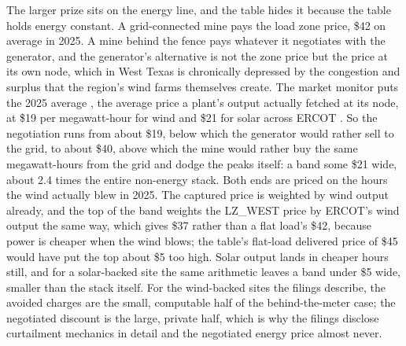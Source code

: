 The larger prize sits on the energy line, and the table hides it because the table holds energy constant. A grid-connected mine pays the load zone price, \$42 on average in 2025. A mine behind the fence pays whatever it negotiates with the generator, and the generator's alternative is not the zone price but the price at its own node, which in West Texas is chronically depressed by the congestion and surplus that the region's wind farms themselves create. The market monitor puts the 2025 average , the average price a plant's output actually fetched at its node, at \$19 per megawatt-hour for wind and \$21 for solar across ERCOT \autocite{potomac2026somercot}. %
So the negotiation runs from about \$19, below which the generator would rather sell to the grid, to about \$40, above which the mine would rather buy the same megawatt-hours from the grid and dodge the peaks itself: a band some \$21 wide, about 2.4 times the entire non-energy stack. Both ends are priced on the hours the wind actually blew in 2025. The captured price is weighted by wind output already, and the top of the band weights the LZ\_WEST price by ERCOT's wind output \autocite{ercotfuelmix2025} the same way, which gives \$37 rather than a flat load's \$42, because power is cheaper when the wind blows; the table's flat-load delivered price of \$45 would have put the top about \$5 too high. Solar output lands in cheaper hours still, and for a solar-backed site the same arithmetic leaves a band under \$5 wide, smaller than the stack itself. For the wind-backed sites the filings describe, the avoided charges are the small, computable half of the behind-the-meter case; the negotiated discount is the large, private half, which is why the filings disclose curtailment mechanics in detail and the negotiated energy price almost never. %

